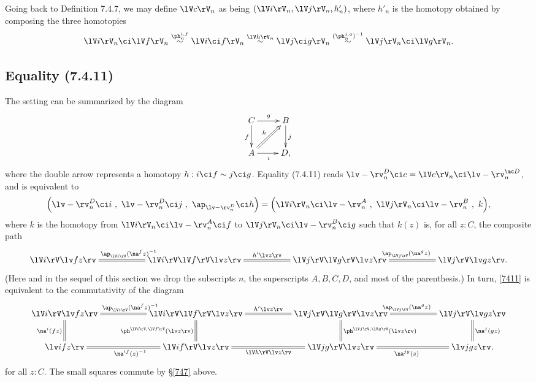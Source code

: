 \documentclass[12pt]{article}
\begin{document}
Going back to Definition 7.4.7, we may define $\lV c\rV_n$ as being $(\lV i\rV_n,\lV j\rV_n,h'_n)$, where $h'_n$ is the homotopy obtained by composing the three homotopies
$$
\lV i\rV_n\ci\lV f\rV_n\overset{\ph_n^{i,f}}{\sim}\lV i\ci f\rV_n\overset{\lV h\rV_n}{\sim}\lV j\ci g\rV_n\overset{(\ph_n^{j,g})^{-1}}{\sim}\lV j\rV_n\ci\lV g\rV_n.
$$


\subsection{Equality (7.4.11)}

The setting can be summarized by the diagram 
$$
\xymatrix{C\ar[r]^g\ar[d]_f&B\ar[d]^j\\ A\ar[r]_i\ar@{=>}[ur]^h&D,}
$$ 
where the double arrow represents a homotopy $h:i\ci f\sim j\ci g$. Equality (7.4.11) reads $\lv-\rv^D_n\ci c=\lV c\rV_n\ci\lv-\rv^{\mc D}_n$, and is equivalent to
\begin{equation}\label{7411}
\Big(\lv-\rv^D_n\ci i\ ,\ \lv-\rv^D_n\ci j\ ,\ \ap_{\lv-\rv^D_n}\ci h\Big)
=
\Big(\lV i\rV_n\ci\lv-\rv^A_n\ ,\ \lV j\rV_n\ci\lv-\rv^B_n\ ,\ k\Big),
\end{equation}
where $k$ is the homotopy from $\lV i\rV_n\ci\lv-\rv^A_n\ci f$ to $\lV j\rV_n\ci\lv-\rv^B_n\ci g$ such that $k(z)$ is, for all $z:C$, the composite path
$$
\xymatrix{
\lV i\rV\lv fz\rv&&
\lV i\rV\lV f\rV\lv z\rv\ar@{=}[ll]_{\ap_{\lV i\rV}(\na^fz)^{-1}}\ar@{=}[rr]^{h'\lv z\rv}&&
\lV j\rV\lV g\rV\lv z\rv\ar@{=}[rr]^{\ap_{\lV j\rV}(\na^gz)}&&
\lV j\rV\lv gz\rv.}
$$ 
(Here and in the sequel of this section we drop the subscripts $n$, the superscripts $A,B,C,D$, and most of the parenthesis.) In turn, \eqref{7411} is equivalent to the commutativity of the diagram %
$$ 
\xymatrix{
\lV i\rV\lv fz\rv\ar@{=}[d]_{\na^i(fz)}&&
\lV i\rV\lV f\rV\lv z\rv\ar@{=}[ll]_{\ap_{\lV i\rV}(\na^fz)^{-1}}\ar@{=}[d]_{\ph^{\lV i\rV,\lV f\rV}(\lv z\rv)}\ar@{=}[rr]^{h'\lv z\rv}&&
\lV j\rV\lV g\rV\lv z\rv\ar@{=}[d]^{\ph^{\lV j\rV,\lV g\rV}(\lv z\rv)}\ar@{=}[rr]^{\ap_{\lV j\rV}(\na^gz)}&&
\lV j\rV\lv gz\rv\ar@{=}[d]^{\na^j(gz)}\\
%
\lv ifz\rv&&\lV if\rV\lv z\rv\ar@{=}[rr]_{\lV h\rV\lv z\rv}\ar@{=}[ll]^{\na^{if}(z)^{-1}}&&\lV jg\rV\lv z\rv\ar@{=}[rr]_{\na^{jg}(z)}&&\lv jgz\rv.}
$$ 
for all $z:C$. The small squares commute by \S\ref{747} above.
\end{document}
